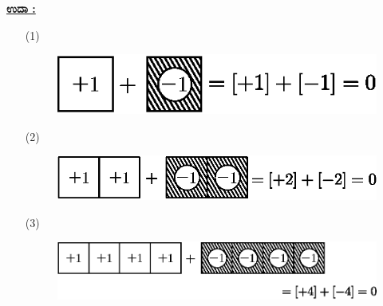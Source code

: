 \noindent
\textbf{\underline{ಉದಾ :}}
\begin{itemize}
\item[(1)]
~
\begin{figure}[H]
\centering
\includegraphics[scale=0.8]{src/figure/chap3/fig3-6a.eps}
\end{figure}
 
\item[(2)] 
~
\begin{figure}[H]
\centering
\includegraphics[scale=0.8]{src/figure/chap3/fig3-6b.eps}
\end{figure} 

\item[(3)] 
~
\begin{figure}[H]
\centering
\includegraphics[scale=0.8]{src/figure/chap3/fig3-6c.eps}
\end{figure}
 \end{itemize}

